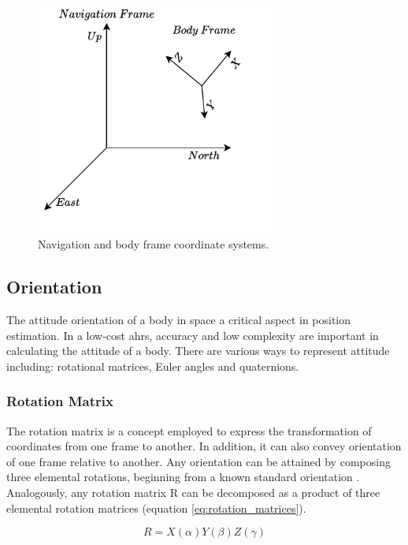 \begin{figure}[!h]
    \centering
    \includegraphics[width=0.7\textwidth]{figures/body_frame.pdf}
    \caption{ Navigation and body frame coordinate systems. }
    \label{fig:body_frame}
\end{figure}

\newpage
\subsection{Orientation}
\label{sub:orientation}

The attitude orientation of a body in space a critical aspect in position estimation. In a low-cost \acrshort{ahrs}, accuracy and low complexity are important in calculating the attitude of a body. There are various ways to represent attitude including: rotational matrices, Euler angles and quaternions.

\subsubsection{Rotation Matrix}

The rotation matrix is a concept employed to express the transformation of coordinates from one frame to another. In addition, it can also convey orientation of one frame relative to another. Any orientation can be attained by composing three elemental rotations, beginning from a known standard orientation \cite{huynh2009metrics}. Analogously, any rotation matrix R can be decomposed as a product of three elemental rotation matrices (equation \ref{eq:rotation_matrices}).

\begin{equation}
    R = X(\alpha)Y(\beta)Z(\gamma)
    \label{eq:rotation_matrices}
\end{equation}


